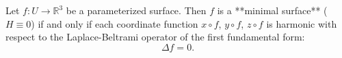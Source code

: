 Let $f: U \to \mathbb{R}^3$ be a parameterized surface. Then $f$ is a **minimal surface** ($H \equiv 0$) if and only if each coordinate function $x \circ f$, $y \circ f$, $z \circ f$ is harmonic with respect to the Laplace-Beltrami operator of the first fundamental form:
$$\Delta f = 0.$$